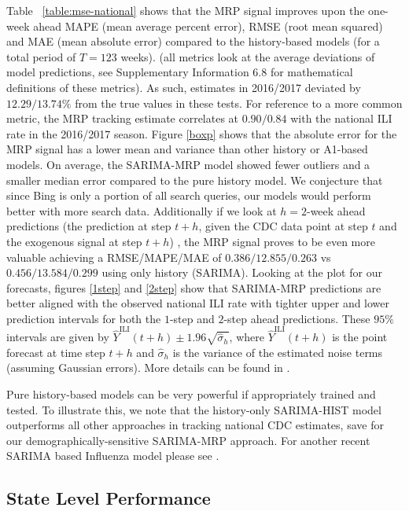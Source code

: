 \documentclass[fleqn,10pt]{wlscirep}
\begin{document}
Table ~\ref{table:mse-national} shows that the MRP signal improves upon the one-week ahead MAPE (mean average percent error), RMSE (root mean squared)  and MAE (mean absolute error) compared to the history-based models (for a total period of $T=123$ weeks). (all metrics look at the average deviations of model predictions, see Supplementary Information 6.8 for mathematical definitions of these metrics). As such, estimates in 2016/2017 deviated by $12.29/13.74\%$ from the true values in these tests. For reference to a more common metric, the MRP tracking estimate correlates at $0.90/0.84$ with the national ILI rate in the 2016/2017 season. Figure \ref{boxp} shows that the absolute error for the MRP signal has a lower mean and variance than other history or A1-based models. On average, the SARIMA-MRP model showed fewer outliers and a smaller median error compared to the pure history model.  We conjecture that since Bing is only a portion of all search queries, our models would perform better with more search data. Additionally if we look at $h=2$-week ahead predictions (the prediction at step $t+h$, given the CDC data point at step $t$ and the exogenous signal at step $t+h$) , the MRP signal proves to be even more valuable achieving a RMSE/MAPE/MAE of $0.386/12.855/0.263$ vs $0.456/13.584/0.299$ using only history (SARIMA). Looking at the plot for our forecasts, figures \ref{1step} and \ref{2step} show that SARIMA-MRP predictions are better aligned with the observed national ILI rate with tighter upper and lower prediction intervals for both the $1$-step and $2$-step ahead predictions.
These $95\%$ intervals are given by $\hat{Y}^{\text{ILI}}(t+h) \pm 1.96 \sqrt{\hat{\sigma}_h}$, where $\hat{Y}^{\text{ILI}}(t+h)$ is the point forecast at time step $t+h$ and $\hat{\sigma}_h$ is the variance of the estimated noise terms (assuming Gaussian errors). More details can be found in \cite{box_etal_2015}.

Pure history-based models can be very powerful if appropriately trained and tested. To illustrate this, we note that the history-only SARIMA-HIST model outperforms all other approaches in tracking national CDC estimates, save for our demographically-sensitive SARIMA-MRP approach. For another recent SARIMA based Influenza model please see \cite{zhang2019predicting}.

\subsection*{State Level Performance}
\end{document}
